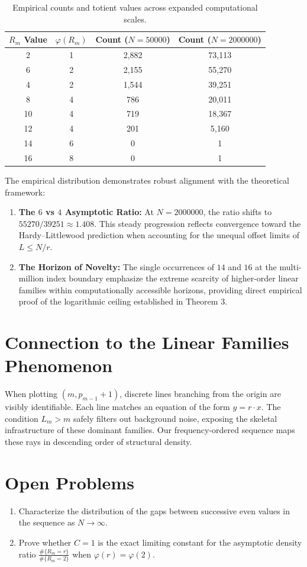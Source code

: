 \documentclass[11pt,fleqn]{article}
\begin{document}
\begin{table}[h!]
\centering
\begin{tabular}{|c|c|c|c|}
\hline
$R_m$ Value & $\varphi(R_m)$ & Count ($N=50000$) & Count ($N=2000000$) \\ \hline
2 & 1 & 2,882 & 73,113 \\ \hline
6 & 2 & 2,155 & 55,270 \\ \hline
4 & 2 & 1,544 & 39,251 \\ \hline
8 & 4 & 786 & 20,011 \\ \hline
10 & 4 & 719 & 18,367 \\ \hline
12 & 4 & 201 & 5,160 \\ \hline
14 & 6 & 0 & 1 \\ \hline
16 & 8 & 0 & 1 \\ \hline
\end{tabular}
\caption{Empirical counts and totient values across expanded computational scales.}
\label{tab:expanded_counts}
\end{table}
The empirical distribution demonstrates robust alignment with the theoretical framework:
\begin{enumerate}
    \item \textbf{The $6$ vs $4$ Asymptotic Ratio:} At $N = 2000000$, the ratio shifts to $55270 / 39251 \approx 1.408$. This steady progression reflects convergence toward the Hardy--Littlewood prediction when accounting for the unequal offset limits of $L \le N/r$.
    \item \textbf{The Horizon of Novelty:} The single occurrences of $14$ and $16$ at the multi-million index boundary emphasize the extreme scarcity of higher-order linear families within computationally accessible horizons, providing direct empirical proof of the logarithmic ceiling established in Theorem 3.
\end{enumerate}
\section{Connection to the Linear Families Phenomenon}
When plotting $(m, p_{m-1}+1)$, discrete lines branching from the origin are visibly identifiable. Each line matches an equation of the form $y = r \cdot x$. The condition $L_m > m$ safely filters out background noise, exposing the skeletal infrastructure of these dominant families. Our frequency-ordered sequence maps these rays in descending order of structural density.

\section{Open Problems}
\begin{enumerate}
    \item Characterize the distribution of the gaps between successive even values in the sequence as $N \to \infty$.
    \item Prove whether $C = 1$ is the exact limiting constant for the asymptotic density ratio $\frac{\#\{R_m=r\}}{\#\{R_m=2\}}$ when $\varphi(r) = \varphi(2)$.
\end{enumerate}
\end{document}
